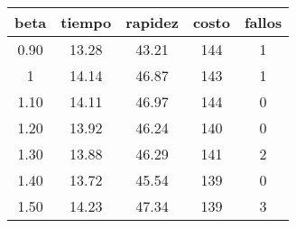 \begin{table}[h!]
\centering
\begin{tabular}{ccccc}
beta & tiempo & rapidez & costo & fallos \\ 
\hline 
0.90 & 13.28 & 43.21 & 144 & 1 \\ 
1 & 14.14 & 46.87 & 143 & 1 \\ 
1.10 & 14.11 & 46.97 & 144 & 0 \\ 
1.20 & 13.92 & 46.24 & 140 & 0 \\ 
1.30 & 13.88 & 46.29 & 141 & 2 \\ 
1.40 & 13.72 & 45.54 & 139 & 0 \\ 
1.50 & 14.23 & 47.34 & 139 & 3 \\ 
\hline 
\end{tabular}
\end{table}